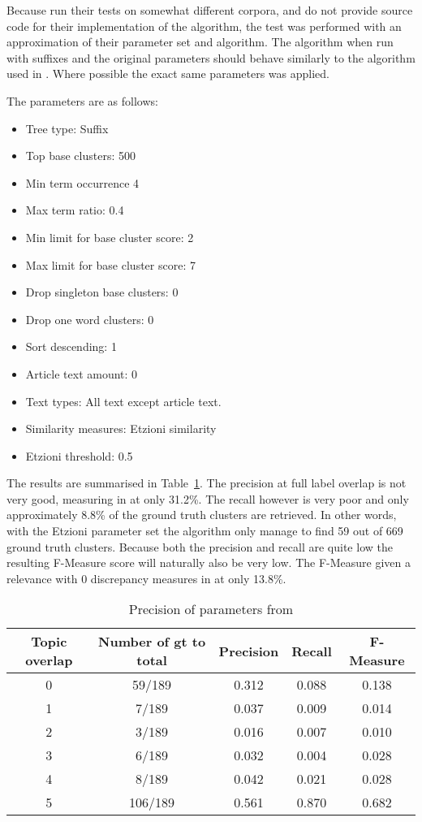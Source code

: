 Because \citeauthor{Oren1998} run their tests on somewhat different corpora, and do not provide source code for their implementation of the \STC algorithm, the test was performed with an approximation of their parameter set and algorithm. The \CTC algorithm when run with suffixes and the original parameters should behave similarly to the algorithm used in . Where possible the exact same parameters was applied.

The parameters are as follows:
\begin{itemize}
  \item Tree type: Suffix
  \item Top base clusters: 500
  \item Min term occurrence 4
  \item Max term ratio: 0.4
  \item Min limit for base cluster score: 2
  \item Max limit for base cluster score: 7
  \item Drop singleton base clusters: 0
  \item Drop one word clusters: 0
  \item Sort descending: 1
  \item Article text amount: 0
  \item Text types: All text except article text.
  \item Similarity measures: Etzioni similarity
  \item Etzioni threshold: 0.5
\end{itemize}

The results are summarised in Table~\ref{tab:etzioniparametersresults}. The precision at full label overlap is not very good, measuring in at only 31.2\%. The recall however is very poor and only approximately 8.8\% of the ground truth clusters are retrieved. In other words, with the Etzioni parameter set the algorithm only manage to find 59 out of 669 ground truth clusters. Because both the precision and recall are quite low the resulting F-Measure score will naturally also be very low. The F-Measure given a relevance with 0 discrepancy measures in at only 13.8\%.

\begin{table}[H]
\begin{center}
\begin{tabular}{|c|c|ccc|}
\hline
Topic overlap & Number of gt to total & Precision  & Recall & F-Measure\\ 
\hline
0&   59/189&    0.312&   0.088&    0.138\\ 
1&    7/189&    0.037&   0.009&    0.014\\ 
2&    3/189&    0.016&   0.007&    0.010\\ 
3&    6/189&    0.032&   0.004&    0.028\\ 
4&    8/189&    0.042&   0.021&    0.028\\ 
5&   106/189&   0.561&   0.870&    0.682\\ 
\hline
\end{tabular}
\end{center}
\caption{Precision of parameters from \citeauthor{Oren1998}}
\label{tab:etzioniparametersresults}
\end{table}


